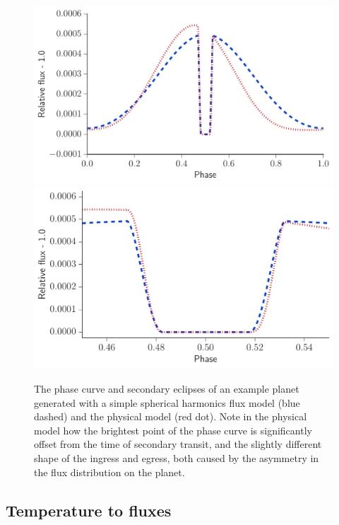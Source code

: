 \documentclass[a4paper,fleqn,usenatbib]{mnras}
\begin{document}
\begin{figure}
\begin{center}
\includegraphics[width=\columnwidth]{img/both_lc.pdf}
\includegraphics[width=\columnwidth]{img/both_lc_zoom.pdf}
\caption{The phase curve and secondary eclipses of an example planet generated with a simple spherical harmonics flux model (blue dashed) and the \citet{Zhang2016} physical model (red dot). Note in the physical model how the brightest point of the phase curve is significantly offset from the time of secondary transit, and the slightly different shape of the ingress and egress, both caused by the asymmetry in the flux distribution on the planet.}
\label{fig:ex_lcs}
\end{center}
\end{figure}

\subsection{Temperature to fluxes}\label{sec:ttof}
\end{document}
